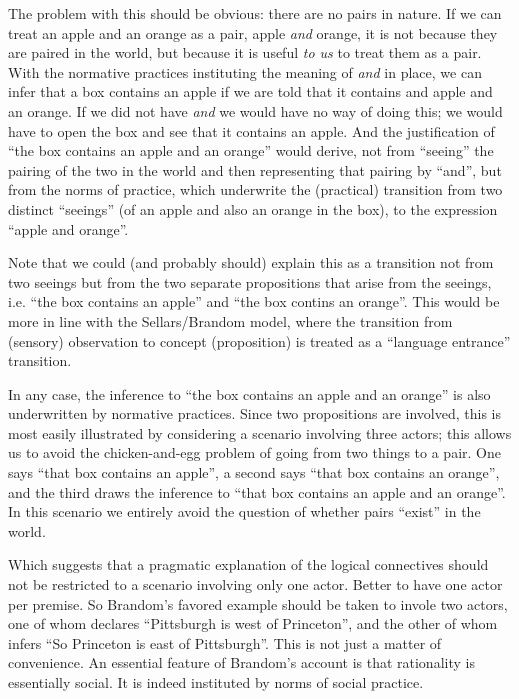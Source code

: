 \documentclass{article}
\begin{document}
The problem with this should be obvious: there are no pairs in nature.
If we can treat an apple and an orange as a pair, apple \textit{and}
orange, it is not because they are paired in the world, but because it
is useful \textit{to us} to treat them as a pair. With the normative
practices instituting the meaning of \textit{and} in place, we can
infer that a box contains an apple if we are told that it contains and
apple and an orange. If we did not have \textit{and} we would have no
way of doing this; we would have to open the box and see that it
contains an apple. And the justification of ``the box contains an
apple and an orange'' would derive, not from ``seeing'' the pairing of
the two in the world and then representing that pairing by ``and'',
but from the norms of practice, which underwrite the (practical)
transition from two distinct ``seeings'' (of an apple and also an
orange in the box), to the expression ``apple and orange''.

Note that we could (and probably should) explain this as a transition
not from two seeings but from the two separate propositions that arise
from the seeings, i.e. ``the box contains an apple'' and ``the box
contins an orange''. This would be more in line with the
Sellars/Brandom model, where the transition from (sensory) observation
to concept (proposition) is treated as a ``language entrance''
transition.

In any case, the inference to ``the box contains an apple and an
orange'' is also underwritten by normative practices. Since two
propositions are involved, this is most easily illustrated by
considering a scenario involving three actors; this allows us to avoid
the chicken-and-egg problem of going from two things to a pair. One
says ``that box contains an apple'', a second says ``that box contains
an orange'', and the third draws the inference to ``that box contains
an apple and an orange''. In this scenario we entirely avoid the
question of whether pairs ``exist'' in the world.

Which suggests that a pragmatic explanation of the logical connectives
should not be restricted to a scenario involving only one actor.
Better to have one actor per premise. So Brandom's favored example
should be taken to invole two actors, one of whom declares
``Pittsburgh is west of Princeton'', and the other of whom infers ``So
Princeton is east of Pittsburgh''. This is not just a matter of
convenience. An essential feature of Brandom's account is that
rationality is essentially social. It is indeed instituted by norms of
social practice.
\end{document}
